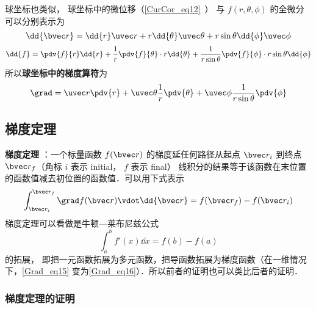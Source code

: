 球坐标也类似， 球坐标中的微位移（\autoref{CurCor_eq12}~） 与 $f(r,\theta,\phi)$ 的全微分可以分别表示为
\begin{equation}
\dd{\bvec r} = \dd{r}\uvec r + r\dd{\theta} \uvec \theta + r\sin\theta\dd{\phi}\uvec \phi
\end{equation}
\begin{equation}
\dd{f} = \pdv{f}{r} \dd{r} + \frac1r \pdv{f}{\theta} \cdot r\dd{\theta} + \frac{1}{ r\sin\theta} \pdv{f}{\phi} \cdot r\sin\theta\dd{\phi}
\end{equation}
所以\textbf{球坐标中的梯度算符}为
\begin{equation}
\grad = \uvec r \pdv{r} + \uvec \theta \frac1r \pdv{\theta} + \uvec \phi \frac{1}{ r\sin\theta} \pdv{\phi}
\end{equation}

\subsection{梯度定理}

\textbf{梯度定理} ：一个标量函数 $f(\bvec r)$ 的梯度延任何路径从起点 $\bvec r_i$ 到终点 $\bvec r_f$（角标 $i$ 表示 initial， $f$ 表示 final）  线积分的结果等于该函数在末位置的函数值减去初位置的函数值．可以用下式表示
\begin{equation}\label{Grad_eq15}
\int_{\bvec r_i}^{\bvec r_f} \grad f(\bvec r) \vdot \dd{\bvec r} = f(\bvec r_f) - f(\bvec r_i)
\end{equation}
梯度定理可以看做是牛顿—莱布尼兹公式
\begin{equation}\label{Grad_eq16}
\int_a^b f'(x) \dd{x}  = f(b) - f(a)
\end{equation}
的拓展， 即把一元函数拓展为多元函数，把导函数拓展为梯度函数（在一维情况下，\autoref{Grad_eq15} 变为\autoref{Grad_eq16}）．所以前者的证明也可以类比后者的证明．

\subsubsection{梯度定理的证明}

